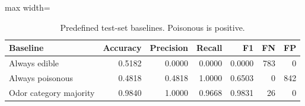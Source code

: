 \begin{table}[H]
\centering\small
\caption{Predefined test-set baselines. Poisonous is positive.}
\begin{adjustbox}{max width=\linewidth}\begin{tabular}{lrrrrrr}
\toprule
Baseline & Accuracy & Precision & Recall & F1 & FN & FP \\
\midrule
Always edible & 0.5182 & 0.0000 & 0.0000 & 0.0000 & 783 & 0 \\
Always poisonous & 0.4818 & 0.4818 & 1.0000 & 0.6503 & 0 & 842 \\
Odor category majority & 0.9840 & 1.0000 & 0.9668 & 0.9831 & 26 & 0 \\
\bottomrule
\end{tabular}\end{adjustbox}
\end{table}
